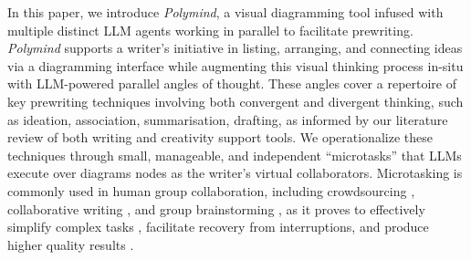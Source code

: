 
In this paper, we introduce \textit{Polymind}, a visual diagramming tool infused with multiple distinct LLM agents working in parallel to facilitate prewriting.
\textit{Polymind} supports a writer's initiative in listing, arranging, and connecting ideas via a diagramming interface while augmenting this visual thinking process in-situ with LLM-powered parallel angles of thought.
These angles cover a repertoire of key prewriting techniques involving both convergent and divergent thinking, such as ideation, association, summarisation, drafting, as informed by our literature review of both writing and creativity support tools.
We operationalize these techniques through small, manageable, and independent ``microtasks'' that LLMs execute over diagrams nodes as the writer's virtual collaborators. Microtasking is commonly used in human group collaboration, including crowdsourcing \cite{latoza2014microtask,chen2017retool}, collaborative writing \cite{iqbal2018multitasking,birnholtz2013write,teevan2016supporting}, and group brainstorming \cite{chilton2019visiblends,teevan2016supporting}, as it proves to effectively simplify complex tasks \cite{cheng2015break,kokkalis2013taskgenies}, facilitate recovery from interruptions, and produce higher quality results \cite{cheng2015break}.
